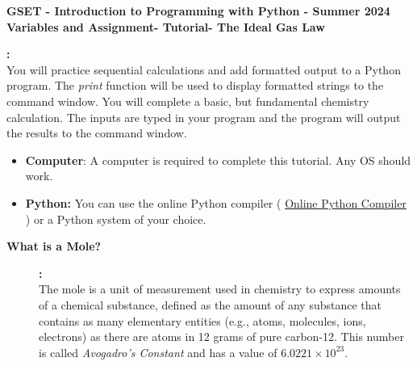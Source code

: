 \documentclass[12pt]{article}
\newcommand{\MNUM}{3} %
\newcommand{\MNAME}{Variables and Assignment} %
\newcommand{\TNAME}{The Ideal Gas Law} %
\newcommand{\SEM}{Summer 2024} %
\begin{document}
\thispagestyle{plain}

\begin{center}
   {\bf \large GSET - Introduction to Programming with Python - \SEM} \vspace{5mm}\\
   {\bf \Large \MNAME \hspc -  Tutorial\hspc\MNUM\hspc - \TNAME}\vspace{3mm}\\
   
\end{center}


\begin{description}[labelindent=1cm]
	
			\item [\textbf{ \Large Overview}] \textbf{ \Large :}\\
			You will practice sequential calculations and add formatted output to a Python program. The {\it print} function will be used to display formatted strings to the command window. You will complete a basic, but fundamental chemistry calculation. The inputs are typed in your program and the program will output the results to the command window. \\
 	
	\item[\textbf{\underline{System Requirements:}}] \hfill \vspace{0mm}

\begin{itemize}
	\item {\bf Computer}: A computer is required to complete this tutorial. Any OS should work.
	\item {\bf Python:} You can use the online Python compiler ( \href{https://www.online-python.com/online_python_compiler}{Online Python Compiler}  ) or a Python system of your choice.
\end{itemize}

	\item[\textbf{\underline{Background:}}] \hfill \vspace{0mm}
	
	\begin{description}

	 	\item [\textbf{ What is a Mole?}] \textbf{ \Large :}\\   
            The mole is a unit of measurement used in chemistry to express amounts of a chemical substance, defined as the amount of any substance that contains as many elementary entities (e.g., atoms, molecules, ions, electrons) as there are atoms in 12 grams of pure carbon-12. This number is called {\it Avogadro's Constant} and has a value of $6.0221\times10^{23}$. \\
            

\end{description}
\end{description}
\end{document}
